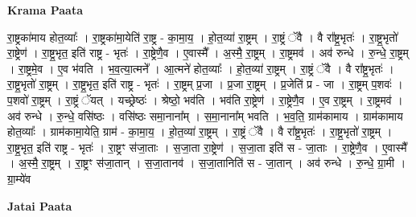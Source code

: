 \documentclass[17pt]{extarticle}
\begin{document}
\textbf{Krama Paata} \newline

रा॒ष्ट्रका॑माय होत॒व्याः᳚ । रा॒ष्ट्रका॑मा॒येति॑ रा॒ष्ट्र - का॒मा॒य॒ । हो॒त॒व्या॑ रा॒ष्ट्रम् । रा॒ष्ट्रं ॅवै । वै रा᳚ष्ट्र॒भृतः॑ । रा॒ष्ट्र॒भृतो॑ रा॒ष्ट्रेण॑ । रा॒ष्ट्र॒भृत॒ इति॑ राष्ट्र - भृतः॑ । रा॒ष्ट्रेणै॒व । ए॒वास्मै᳚ । अ॒स्मै॒ रा॒ष्ट्रम् । रा॒ष्ट्रमव॑ । अव॑ रुन्धे । रु॒न्धे॒ रा॒ष्ट्रम् । रा॒ष्ट्रमे॒व । ए॒व भ॑वति । भ॒व॒त्या॒त्मने᳚ । आ॒त्मने॑ होत॒व्याः᳚ । हो॒त॒व्या॑ रा॒ष्ट्रम् । रा॒ष्ट्रं ॅवै । वै रा᳚ष्ट्र॒भृतः॑ । रा॒ष्ट्र॒भृतो॑ रा॒ष्ट्रम् । रा॒ष्ट्र॒भृत॒ इति॑ राष्ट्र - भृतः॑ । रा॒ष्ट्रम् प्र॒जा । प्र॒जा रा॒ष्ट्रम् । प्र॒जेति॑ प्र - जा । रा॒ष्ट्रम् प॒शवः॑ । प॒शवो॑ रा॒ष्ट्रम् । रा॒ष्ट्रं ॅयत् । यच्छ्रेष्ठः॑ । श्रेष्ठो॒ भव॑ति । भव॑ति रा॒ष्ट्रेण॑ । रा॒ष्ट्रेणै॒व । ए॒व रा॒ष्ट्रम् । रा॒ष्ट्रमव॑ । अव॑ रुन्धे । रु॒न्धे॒ वसि॑ष्ठः । वसि॑ष्ठः समा॒नाना᳚म् । स॒मा॒नाना᳚म् भवति । भ॒व॒ति॒ ग्राम॑कामाय । ग्राम॑कामाय होत॒व्याः᳚ । ग्राम॑कामा॒येति॒ ग्राम॑ - का॒मा॒य॒ । हो॒त॒व्या॑ रा॒ष्ट्रम् । रा॒ष्ट्रं ॅवै । वै रा᳚ष्ट्र॒भृतः॑ । रा॒ष्ट्र॒भृतो॑ रा॒ष्ट्रम् । रा॒ष्ट्र॒भृत॒ इति॑ राष्ट्र - भृतः॑ । रा॒ष्ट्रꣳ स॑जा॒ताः । स॒जा॒ता रा॒ष्ट्रेण॑ । स॒जा॒ता इति॑ स - जा॒ताः । रा॒ष्ट्रेणै॒व । ए॒वास्मै᳚ । अ॒स्मै॒ रा॒ष्ट्रम् । रा॒ष्ट्रꣳ स॑जा॒तान् । स॒जा॒तानव॑ । स॒जा॒तानिति॑ स - जा॒तान् । अव॑ रुन्धे । रु॒न्धे॒ ग्रा॒मी । ग्रा॒म्ये॑व \newline

\textbf{Jatai Paata} \newline
\end{document}
